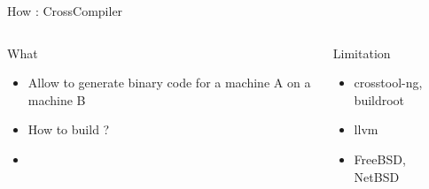 %
\begin{Frame}{How : CrossCompiler}
  \begin{columns}[t]
    \begin{column}{5cm} %
      \begin{block}{What}
        \begin{itemize}
        \item Allow to generate binary code for a machine A on a
          machine B
        \item How to build ?
        \item 
        \end{itemize}
      \end{block} 
    \end{column}
    
    \begin{column}{5cm} %
      \begin{block}{Limitation}
        \begin{itemize}
        \item crosstool-ng, buildroot
        \item llvm
        \item FreeBSD, NetBSD
        \end{itemize}
      \end{block}   
    \end{column}
  \end{columns}  
\end{Frame}



